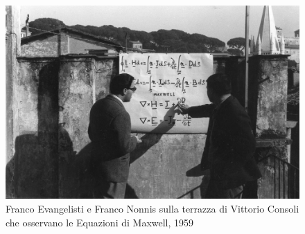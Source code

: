 \begin{figure}[h!]
    \begin{center}
        \vspace{0.5cm}
        \includegraphics[width=12cm]{figures/EvangelistiNonnis.jpg}
        \caption{Franco Evangelisti e Franco Nonnis sulla terrazza di Vittorio Consoli 
        che osservano le Equazioni di Maxwell, 1959}
        \vspace{0.5cm}
        \end{center}
\end{figure} 